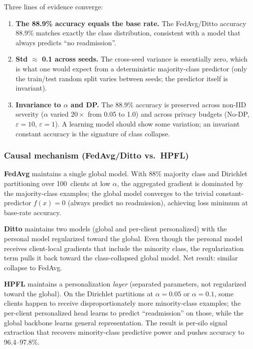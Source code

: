 \documentclass[conference]{IEEEtran}
\begin{document}
Three lines of evidence converge:
\begin{enumerate}
\item \textbf{The 88.9\% accuracy equals the base rate.} The FedAvg/Ditto accuracy 88.9\% matches exactly the class distribution, consistent with a model that always predicts ``no readmission''.
\item \textbf{Std $\approx$ 0.1 across seeds.} The cross-seed variance is essentially zero, which is what one would expect from a deterministic majority-class predictor (only the train/test random split varies between seeds; the predictor itself is invariant).
\item \textbf{Invariance to $\alpha$ and DP.} The 88.9\% accuracy is preserved across non-IID severity ($\alpha$ varied $20\times$ from 0.05 to 1.0) and across privacy budgets (No-DP, $\varepsilon{=}10$, $\varepsilon{=}1$). A learning model should show some variation; an invariant constant accuracy is the signature of class collapse.
\end{enumerate}

\subsubsection*{Causal mechanism (FedAvg/Ditto vs.\ HPFL)}

\textbf{FedAvg} maintains a single global model. With 88\% majority class and Dirichlet partitioning over 100~clients at low $\alpha$, the aggregated gradient is dominated by the majority-class examples; the global model converges to the trivial constant-predictor $f(x){=}0$ (always predict no readmission), achieving loss minimum at base-rate accuracy.

\textbf{Ditto} maintains two models (global and per-client personalized) with the personal model regularized toward the global. Even though the personal model receives client-local gradients that include the minority class, the regularization term pulls it back toward the class-collapsed global model. Net result: similar collapse to FedAvg.

\textbf{HPFL} maintains a personalization \emph{layer} (separated parameters, not regularized toward the global). On the Dirichlet partitions at $\alpha{=}0.05$ or $\alpha{=}0.1$, some clients happen to receive disproportionately more minority-class examples; the per-client personalized head learns to predict ``readmission'' on those, while the global backbone learns general representation. The result is per-silo signal extraction that recovers minority-class predictive power and pushes accuracy to 96.4--97.8\%.
\end{document}
